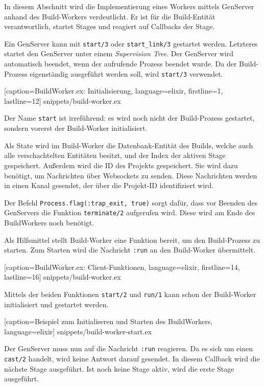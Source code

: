 In diesem Abschnitt wird die Implementierung eines Workers mittels GenServer anhand des Build-Workers verdeutlicht. Er ist für die Build-Entität verantwortlich, startet Stages und reagiert auf Callbacks der Stage.

Ein GenServer kann mit \texttt{start/3} oder \texttt{start\_link/3} gestartet werden. Letzteres startet den GenServer unter einem \emph{Supervision Tree}. Der GenServer wird automatisch beendet, wenn der aufrufende Prozess beendet wurde. Da der Build-Prozess eigenständig ausgeführt werden soll, wird \texttt{start/3} verwendet.


  [caption={BuildWorker.ex: Initialisierung},
  language=elixir,
  firstline=1,
  lastline=12]
  {snippets/build-worker.ex}

Der Name \texttt{start} ist irreführend: es wird noch nicht der Build-Prozess gestartet, sondern vorerst der Build-Worker initialisiert.

Als State wird im Build-Worker die Datenbank-Entität des Builds, welche auch alle verschachtelten Entitäten besitzt, und der Index der aktiven Stage gespeichert. Außerdem wird die ID des Projekts gespeichert. Sie wird dazu benötigt, um Nachrichten über Websockets zu senden. Diese Nachrichten werden in einen Kanal gesendet, der über die Projekt-ID identifiziert wird.

Der Befehl \texttt{Process.flag(:trap\_exit,\allowbreak\ true)} sorgt dafür, dass vor Beenden des GenServers die Funktion \texttt{terminate/2} aufgerufen wird. Diese wird am Ende des BuildWorkers noch benötigt.

Als Hilfsmittel stellt Build-Worker eine Funktion bereit, um den Build-Prozess zu starten. Zum Starten wird die Nachricht \texttt{:run} an den Build-Worker übermittelt.


  [caption={BuildWorker.ex: Client-Funktionen},
  language=elixir,
  firstline=14,
  lastline=16]
  {snippets/build-worker.ex}

Mittels der beiden Funktionen \texttt{start/2} und \texttt{run/1} kann schon der Build-Worker initialisiert und gestartet werden.


  [caption={Beispiel zum Initialiseren und Starten des BuildWorkers},
  language=elixir]
  {snippets/build-worker-start.ex}

Der GenServer muss nun auf die Nachricht \texttt{:run} reagieren. Da es sich um einen \texttt{cast/2} handelt, wird keine Antwort darauf gesendet. In diesem Callback wird die nächste Stage ausgeführt. Ist noch keine Stage aktiv, wird die erste Stage ausgeführt.


